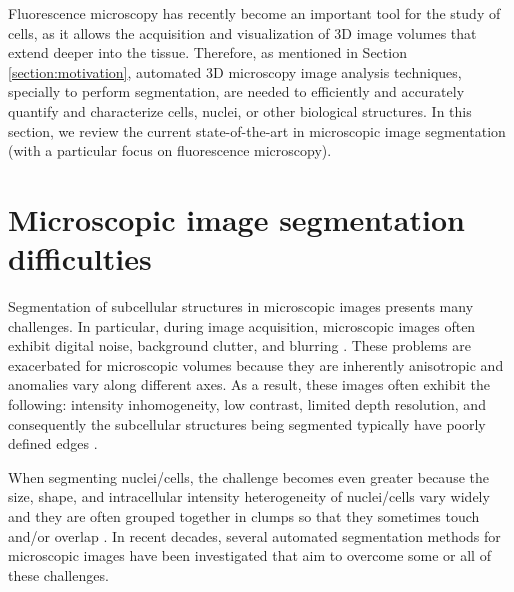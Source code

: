 \label{chapter:state_of_the_art}

Fluorescence microscopy has recently become an important tool for the study of cells, as it allows the acquisition and visualization of \ac{3D} image volumes that extend deeper into the tissue. Therefore, as mentioned in Section \ref{section:motivation}, automated \ac{3D} microscopy image analysis techniques, specially to perform segmentation, are needed to efficiently and accurately quantify and characterize cells, nuclei, or other biological structures. In this section, we review the current state-of-the-art in microscopic image segmentation (with a particular focus on fluorescence microscopy).


\section{Microscopic image segmentation difficulties}

Segmentation of subcellular structures in microscopic images presents many challenges. In particular, during image acquisition, microscopic images often exhibit digital noise, background clutter, and blurring \cite{review:robust}. These problems are exacerbated for microscopic volumes because they are inherently anisotropic and anomalies vary along different axes. As a result, these images often exhibit the following: intensity inhomogeneity, low contrast, limited depth resolution, and consequently the subcellular structures being segmented typically have poorly defined edges \cite{active:inhmo}. 

When segmenting nuclei/cells, the challenge becomes even greater because the size, shape, and intracellular intensity heterogeneity of nuclei/cells vary widely and they are often grouped together in clumps so that they sometimes touch and/or overlap \cite{review:robust}. In recent decades, several automated segmentation methods for microscopic images have been investigated that aim to overcome some or all of these challenges.


